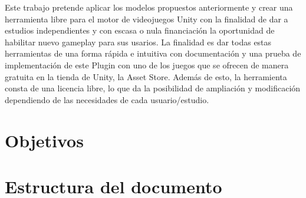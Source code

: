 Este trabajo pretende aplicar los modelos propuestos anteriormente y crear una herramienta libre para el motor de videojuegos Unity con la finalidad de dar a estudios independientes y con escasa o nula financiaci\'on la oportunidad de habilitar nuevo gameplay para sus usarios. La finalidad es dar todas estas herramientas de una forma r\'apida e intuitiva con documentaci\'on y una prueba de implementaci\'on de este Plugin con uno de los juegos que se ofrecen de manera gratuita en la tienda de Unity, la Asset Store. Adem\'as de esto, la herramienta consta de una licencia libre, lo que da la posibilidad de ampliaci\'on y modificaci\'on dependiendo de las necesidades de cada usuario/estudio.

\section{Objetivos}


\section{Estructura del documento}



